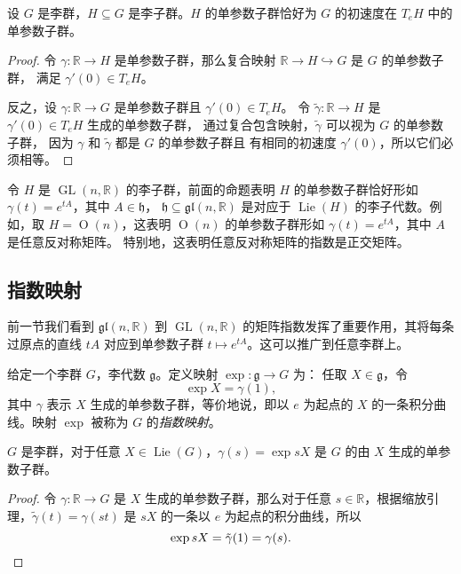 \documentclass[fontset=none]{Notes}
\DeclareMathOperator\GL{GL}
\DeclareMathOperator\Orth{O}
\DeclareMathOperator\Lie{Lie}
\newcommand{\lie}[1]{\mathfrak{#1}}
\begin{document}
\begin{proposition}
  设 $G$ 是李群，$H\subseteq G$ 是李子群。$H$ 的单参数子群恰好为
  $G$ 的初速度在 $T_eH$ 中的单参数子群。
\end{proposition}
\begin{proof}
  令 $\gamma:\mathbb{R}\to H$ 是单参数子群，那么复合映射
  $\mathbb{R}\to H\hookrightarrow G$ 是 $G$ 的单参数子群，
  满足 $\gamma'(0)\in T_eH$。

  反之，设 $\gamma:\mathbb{R}\to G$ 是单参数子群且 $\gamma'(0)\in T_eH$。
  令 $\tilde{\gamma}:\mathbb{R}\to H$ 是 $\gamma'(0)\in T_eH$ 生成的单参数子群，
  通过复合包含映射，$\tilde{\gamma}$ 可以视为 $G$ 的单参数子群，
  因为 $\gamma$ 和 $\tilde{\gamma}$ 都是 $G$ 的单参数子群且
  有相同的初速度 $\gamma'(0)$，所以它们必须相等。
\end{proof}

\begin{example}
  令 $H$ 是 $\GL(n,\mathbb{R})$ 的李子群，前面的命题表明
  $H$ 的单参数子群恰好形如 $\gamma(t)=e^{tA}$，其中 $A\in\lie h$，
  $\lie h\subseteq \lie{gl}(n,\mathbb{R})$ 是对应于 $\Lie(H)$
  的李子代数。例如，取 $H=\Orth(n)$，这表明 $\Orth(n)$
  的单参数子群形如 $\gamma(t)=e^{tA}$，其中 $A$ 是任意反对称矩阵。
  特别地，这表明任意反对称矩阵的指数是正交矩阵。
\end{example}

\subsection{指数映射}

前一节我们看到 $\lie{gl}(n,\mathbb{R})$ 到 $\GL(n,\mathbb{R})$
的矩阵指数发挥了重要作用，其将每条过原点的直线 $tA$ 对应到单参数子群
$t\mapsto e^{tA}$。这可以推广到任意李群上。

给定一个李群 $G$，李代数 $\lie g$。定义映射 $\exp:\lie g\to G$ 为：
任取 $X\in \lie g$，令
\[
  \exp X=\gamma(1),  
\]
其中 $\gamma$ 表示 $X$ 生成的单参数子群，等价地说，即以 $e$ 为起点的
$X$ 的一条积分曲线。映射 $\exp$ 被称为 $G$ 的\emph{指数映射}。

\begin{proposition}
  $G$ 是李群，对于任意 $X\in\Lie(G)$，$\gamma(s)=\exp sX$ 是
  $G$ 的由 $X$ 生成的单参数子群。
\end{proposition}
\begin{proof}
  令 $\gamma:\mathbb{R}\to G$ 是 $X$ 生成的单参数子群，那么对于任意
  $s\in \mathbb{R}$，根据缩放引理，$\tilde{\gamma}(t)=\gamma(st)$
  是 $sX$ 的一条以 $e$ 为起点的积分曲线，所以
  \[
    \exp sX=\tilde{\gamma}(1)=\gamma(s).\qedhere  
  \]
\end{proof}
\end{document}
